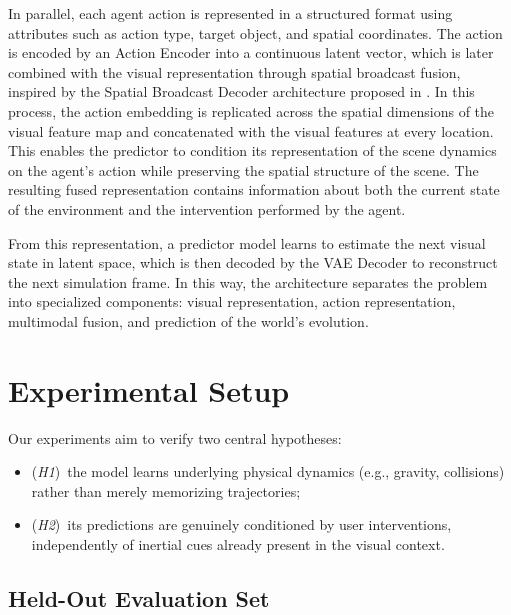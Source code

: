 \documentclass[conference]{IEEEtran}
\begin{document}
In parallel, each agent action is represented in a structured format using attributes such as action type, target object, and spatial coordinates. The action is encoded by an Action Encoder into a continuous latent vector, which is later combined with the visual representation through spatial broadcast fusion, inspired by the Spatial Broadcast Decoder architecture proposed in \cite{watters2019spatial}. In this process, the action embedding is replicated across the spatial dimensions of the visual feature map and concatenated with the visual features at every location. This enables the predictor to condition its representation of the scene dynamics on the agent's action while preserving the spatial structure of the scene. The resulting fused representation contains information about both the current state of the environment and the intervention performed by the agent.

From this representation, a predictor model learns to estimate the next visual state in latent space, which is then decoded by the VAE Decoder to reconstruct the next simulation frame. In this way, the architecture separates the problem into specialized components: visual representation, action representation, multimodal fusion, and prediction of the world's evolution.


\section{Experimental Setup}
\label{sec:experimental_setup}

Our experiments aim to verify two central hypotheses:
\begin{itemize}
    \item (\textit{H1})~the model learns underlying physical dynamics (e.g., gravity, collisions) rather than merely memorizing trajectories;
    \item (\textit{H2})~its predictions are genuinely conditioned by user interventions, independently of inertial cues already present in the visual context.
\end{itemize}

\subsection{Held-Out Evaluation Set}
\end{document}
